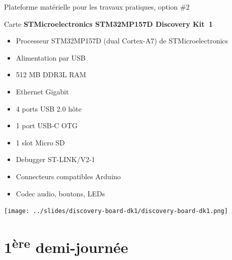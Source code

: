 \documentclass[a4paper,12pt,obeyspaces,spaces,hyphens]{article}
\begin{document}
\feagendatwocolumn
{Plateforme matérielle pour les travaux pratiques, option \#2}
{
  Carte {\bf STMicroelectronics STM32MP157D Discovery Kit~1}
  \begin{itemize}
  \item Processeur STM32MP157D (dual Cortex-A7) de STMicroelectronics
  \item Alimentation par USB
  \item 512 MB DDR3L RAM
  \item Ethernet Gigabit
  \item 4 ports USB 2.0 hôte
  \item 1 port USB-C OTG
  \item 1 slot Micro SD
  \item Debugger ST-LINK/V2-1
  \item Connecteurs compatibles Arduino
  \item Codec audio, boutons, LEDs
  \end{itemize}
}
{}
{
  \begin{center}
    \texttt{[image: ../slides/discovery-board-dk1/discovery-board-dk1.png]}
  \end{center}
}

\section{1\textsuperscript{ère} demi-journée}
\end{document}
